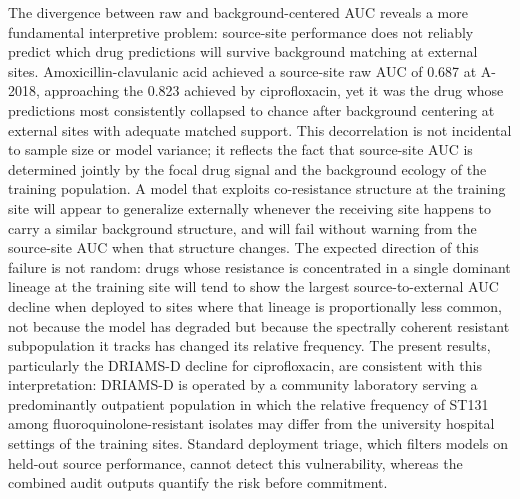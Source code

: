 \documentclass[11pt]{article}
\begin{document}
The divergence between raw and background-centered AUC reveals a more fundamental interpretive problem: source-site performance does not reliably predict which drug predictions will survive background matching at external sites. Amoxicillin-clavulanic acid achieved a source-site raw AUC of 0.687 at A-2018, approaching the 0.823 achieved by ciprofloxacin, yet it was the drug whose predictions most consistently collapsed to chance after background centering at external sites with adequate matched support. This decorrelation is not incidental to sample size or model variance; it reflects the fact that source-site AUC is determined jointly by the focal drug signal and the background ecology of the training population. A model that exploits co-resistance structure at the training site will appear to generalize externally whenever the receiving site happens to carry a similar background structure, and will fail without warning from the source-site AUC when that structure changes. The expected direction of this failure is not random: drugs whose resistance is concentrated in a single dominant lineage at the training site will tend to show the largest source-to-external AUC decline when deployed to sites where that lineage is proportionally less common, not because the model has degraded but because the spectrally coherent resistant subpopulation it tracks has changed its relative frequency. The present results, particularly the DRIAMS-D decline for ciprofloxacin, are consistent with this interpretation: DRIAMS-D is operated by a community laboratory serving a predominantly outpatient population in which the relative frequency of ST131 among fluoroquinolone-resistant isolates may differ from the university hospital settings of the training sites. Standard deployment triage, which filters models on held-out source performance, cannot detect this vulnerability, whereas the combined audit outputs quantify the risk before commitment.
\end{document}
